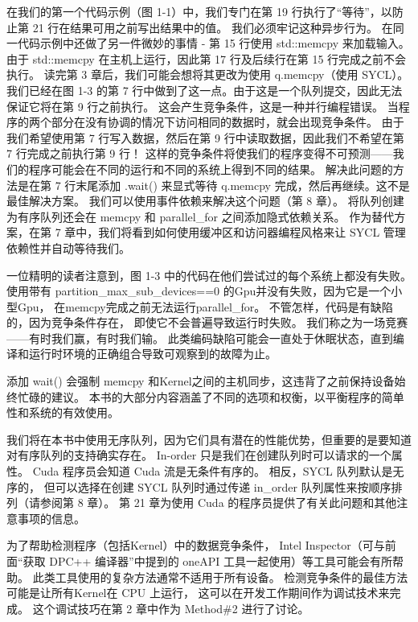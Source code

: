 在我们的第一个代码示例（图 1-1）中，我们专门在第 19 行执行了“等待”，以防止第 21 行在结果可用之前写出结果中的值。 
我们必须牢记这种异步行为。 在同一代码示例中还做了另一件微妙的事情 - 第 15 行使用 std::memcpy 来加载输入。 
由于 std::memcpy 在主机上运行，因此第 17 行及后续行在第 15 行完成之前不会执行。 
读完第 3 章后，我们可能会想将其更改为使用 q.memcpy（使用 SYCL）。 
我们已经在图 1-3 的第 7 行中做到了这一点。由于这是一个队列提交，因此无法保证它将在第 9 行之前执行。
这会产生竞争条件，这是一种并行编程错误。 当程序的两个部分在没有协调的情况下访问相同的数据时，就会出现竞争条件。 
由于我们希望使用第 7 行写入数据，然后在第 9 行中读取数据，因此我们不希望在第 7 行完成之前执行第 9 行！ 
这样的竞争条件将使我们的程序变得不可预测——我们的程序可能会在不同的运行和不同的系统上得到不同的结果。 
解决此问题的方法是在第 7 行末尾添加 .wait() 来显式等待 q.memcpy 完成，然后再继续。这不是最佳解决方案。 
我们可以使用事件依赖来解决这个问题（第 8 章）。 
将队列创建为有序队列还会在 memcpy 和 parallel\_for 之间添加隐式依赖关系。 
作为替代方案，在第 7 章中，我们将看到如何使用缓冲区和访问器编程风格来让 SYCL 管理依赖性并自动等待我们。

\begin{remark}[竞争条件并不总是导致程序失败]
	一位精明的读者注意到，图 1-3 中的代码在他们尝试过的每个系统上都没有失败。 
	使用带有 partition\_max\_sub\_devices==0 的Gpu并没有失败，因为它是一个小型Gpu，
	在memcpy完成之前无法运行parallel\_for。 不管怎样，代码是有缺陷的，因为竞争条件存在，
	即使它不会普遍导致运行时失败。 我们称之为一场竞赛——有时我们赢，有时我们输。 
	此类编码缺陷可能会一直处于休眠状态，直到编译和运行时环境的正确组合导致可观察到的故障为止。
\end{remark}

添加 wait() 会强制 memcpy 和Kernel之间的主机同步，这违背了之前保持设备始终忙碌的建议。 
本书的大部分内容涵盖了不同的选项和权衡，以平衡程序的简单性和系统的有效使用。

\begin{remark}
	我们将在本书中使用无序队列，因为它们具有潜在的性能优势，但重要的是要知道对有序队列的支持确实存在。 
	In-order 只是我们在创建队列时可以请求的一个属性。 Cuda 程序员会知道 Cuda 流是无条件有序的。 
	相反，SYCL 队列默认是无序的，
	但可以选择在创建 SYCL 队列时通过传递 in\_order 队列属性来按顺序排列（请参阅第 8 章）。 
	第 21 章为使用 Cuda 的程序员提供了有关此问题和其他注意事项的信息。
\end{remark}

为了帮助检测程序（包括Kernel）中的数据竞争条件，
Intel Inspector（可与前面“获取 DPC++ 编译器”中提到的 oneAPI 工具一起使用）等工具可能会有所帮助。 
此类工具使用的复杂方法通常不适用于所有设备。 检测竞争条件的最佳方法可能是让所有Kernel在 CPU 上运行，
这可以在开发工作期间作为调试技术来完成。 这个调试技巧在第 2 章中作为 Method\#2 进行了讨论。

